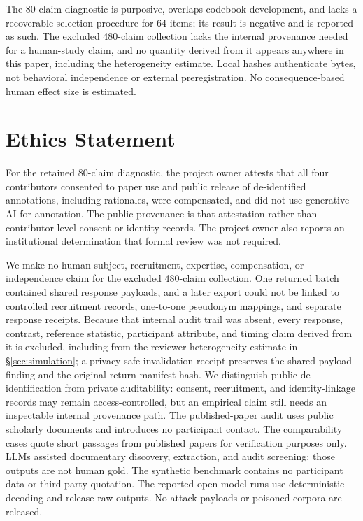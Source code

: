 \documentclass[11pt]{article}
\begin{document}
The 80-claim diagnostic is purposive, overlaps codebook development, and lacks
a recoverable selection procedure for 64 items; its result is negative and is
reported as such. The excluded 480-claim collection lacks the internal
provenance needed for a human-study claim, and no quantity derived from it
appears anywhere in this paper, including the heterogeneity estimate. Local
hashes authenticate bytes, not behavioral independence or external
preregistration. No consequence-based human effect size is estimated.

\section*{Ethics Statement}

For the retained 80-claim diagnostic, the project owner attests that all four
contributors consented to paper use and public release of de-identified
annotations, including rationales, were compensated, and did not use
generative AI for annotation. The public provenance is that attestation rather
than contributor-level consent or identity records. The project owner also
reports an institutional determination that formal review was not required.

We make no human-subject, recruitment, expertise, compensation, or
independence claim for the excluded 480-claim collection. One returned batch
contained shared response payloads, and a later export could not be linked to
controlled recruitment records, one-to-one pseudonym mappings, and separate
response receipts. Because that internal audit trail was absent, every
response, contrast, reference statistic, participant attribute, and timing
claim derived from it is excluded, including from the reviewer-heterogeneity
estimate in \S\ref{sec:simulation}; a privacy-safe invalidation receipt
preserves the shared-payload finding and the original return-manifest hash. We
distinguish public de-identification from private auditability: consent,
recruitment, and identity-linkage records may remain access-controlled, but an
empirical claim still needs an inspectable internal provenance path. The
published-paper audit uses public scholarly documents and introduces no
participant contact. The comparability cases quote short passages from
published papers for verification purposes only. LLMs assisted documentary
discovery, extraction, and audit screening; those outputs are not human gold.
The synthetic benchmark contains no participant data or third-party
quotation. The reported open-model runs use deterministic decoding and release
raw outputs. No attack payloads or poisoned corpora are released.
\end{document}
